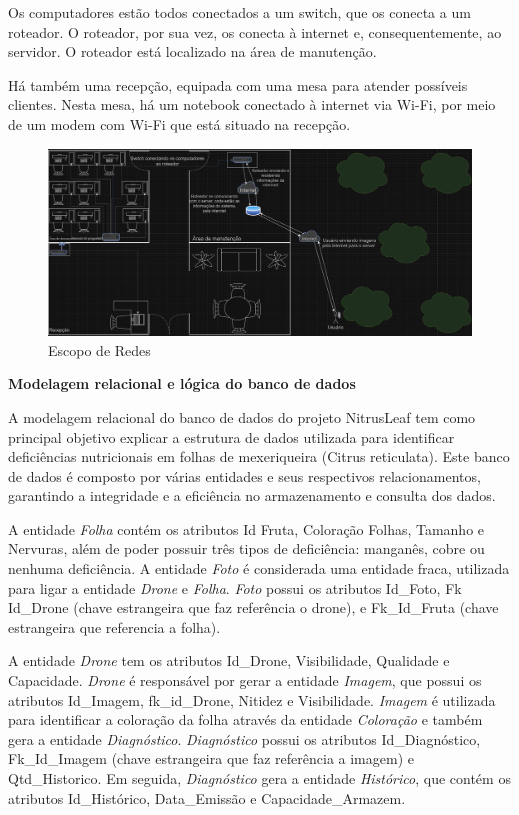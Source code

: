 Os computadores estão todos conectados a um switch, que os conecta a um roteador. O roteador, por sua vez, os conecta à internet e, consequentemente, ao servidor. O roteador está localizado na área de manutenção.

Há também uma recepção, equipada com uma mesa para atender possíveis clientes. Nesta mesa, há um notebook conectado à internet via Wi-Fi, por meio de um modem com Wi-Fi que está situado na recepção.

\begin{figure}[H]
\centering
\caption{Escopo de Redes}%
\label{fig:escopoderedes}
\includegraphics[width=0.8\linewidth]{Illustrations/escopoderedes.png}
\end{figure}

\textbf{Modelagem relacional e lógica do banco de dados}

A modelagem relacional do banco de dados  do projeto NitrusLeaf tem como principal objetivo explicar a estrutura de dados utilizada para identificar deficiências nutricionais em folhas de mexeriqueira (Citrus reticulata). Este banco de dados é composto por várias entidades e seus respectivos relacionamentos, garantindo a integridade e a eficiência no armazenamento e consulta dos dados.

A entidade \textit{Folha} contém os atributos Id Fruta, Coloração Folhas, Tamanho e Nervuras, além de poder possuir três tipos de deficiência: manganês, cobre ou nenhuma deficiência. A entidade \textit{Foto} é considerada uma entidade fraca, utilizada para ligar a entidade \textit{Drone} e \textit{Folha}. \textit{Foto} possui os atributos Id\_Foto, Fk Id\_Drone (chave estrangeira que faz referência o drone), e Fk\_Id\_Fruta (chave estrangeira que referencia a folha).

A entidade \textit{Drone} tem os atributos Id\_Drone, Visibilidade, Qualidade e Capacidade. \textit{Drone} é responsável por gerar a entidade \textit{Imagem}, que possui os atributos Id\_Imagem, fk\_id\_Drone, Nitidez e Visibilidade. \textit{Imagem} é utilizada para identificar a coloração da folha através da entidade \textit{Coloração} e também gera a entidade \textit{Diagnóstico}. \textit{Diagnóstico} possui os atributos Id\_Diagnóstico, Fk\_Id\_Imagem (chave estrangeira que faz referência a imagem) e Qtd\_Historico. Em seguida, \textit{Diagnóstico} gera a entidade \textit{Histórico}, que contém os atributos Id\_Histórico, Data\_Emissão e Capacidade\_Armazem.


